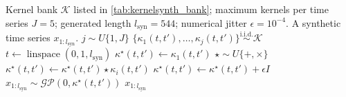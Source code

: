 \begin{algorithm}[H]
\caption{KernelSynth: Synthetic Data Generation using Gaussian Processes}%
\label{alg:kernelsynth}
\begin{algorithmic}[1]
\Require Kernel bank $\mathcal{K}$ listed in \autoref{tab:kernelsynth_bank}; maximum kernels per time series $J=5$; generated length $l_{\mathrm{syn}}=544$; numerical jitter $\epsilon=10^{-4}$.
\Ensure A synthetic time series $x_{1:l_{\mathrm{syn}}}$.
\State $j \sim U\{1,J\}$ 
\State $\{\kappa_1(t,t'),\ldots,\kappa_j(t,t')\} \overset{\mathrm{i.i.d.}}{\sim} \mathcal{K}$ 
\State $t \gets \operatorname{linspace}(0,1,l_{\mathrm{syn}})$
\State $\kappa^\star(t,t') \gets \kappa_1(t,t')$ 
    \State $\star \sim U\{+,\times\}$ 
    \State $\kappa^\star(t,t') \gets \kappa^\star(t,t') \star \kappa_i(t,t')$ 
\EndFor%
    \State $\kappa^\star(t,t') \gets \kappa^\star(t,t') + \epsilon I$
\EndIf%
\State $x_{1:l_{\mathrm{syn}}} \sim \mathcal{GP}(0,\kappa^\star(t,t'))$ 
\State \Return $x_{1:l_{\mathrm{syn}}}$
\end{algorithmic}
\end{algorithm}
